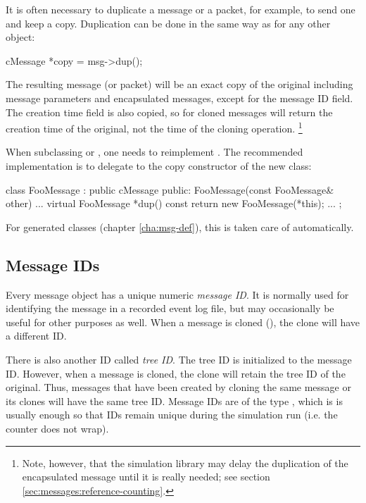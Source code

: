 It is often necessary to duplicate a message or a packet, for example,
to send one and keep a copy. Duplication can be done in the same way as
for any other {\opp} object:

\begin{cpp}
cMessage *copy = msg->dup();
\end{cpp}

The resulting message (or packet) will be an exact copy of the original
including message parameters and encapsulated messages, except for the
message ID field. The creation time field is also copied, so
for cloned messages  will return the creation
time of the original, not the time of the cloning operation.
  \footnote{Note, however, that the simulation library may delay the
  duplication of the encapsulated message until it is really needed;
  see section \ref{sec:messages:reference-counting}.}

When subclassing  or , one needs
to reimplement . The recommended implementation is to delegate
to the copy constructor of the new class:

\begin{cpp}
class FooMessage : public cMessage {
  public:
    FooMessage(const FooMessage& other) {...}
    virtual FooMessage *dup() const {return new FooMessage(*this);}
    ...
};
\end{cpp}

For generated classes (chapter \ref{cha:msg-def}), this is
taken care of automatically.


\subsection{Message IDs}
\label{sec:messages:message-ids}

Every message object has a unique numeric \textit{message ID}. It is normally
used for identifying the message in a recorded event log file, but may occasionally
be useful for other purposes as well. When a message is cloned (),
the clone will have a different ID.

There is also another ID called \textit{tree ID}. The tree ID is initialized
to the message ID. However, when a message is cloned, the clone will retain
the tree ID of the original. Thus, messages that have been created by cloning
the same message or its clones will have the same tree ID.  Message IDs are
of the type , which is is usually enough so that IDs remain unique
during the simulation run (i.e. the counter does not wrap).

